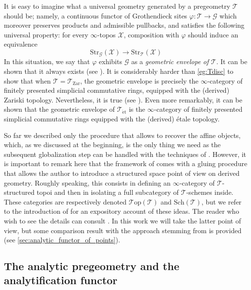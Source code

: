 \documentclass[12pt,a4paper,reqno]{amsart}
\theoremstyle{plain}
\theoremstyle{definition}
\theoremstyle{remark}
\numberwithin{equation}{section}
\begin{document}
It is easy to imagine what a universal geometry generated by a pregeometry ${\mathcal T}$ should be; namely, a continuous functor of Grothendieck sites $\varphi \colon {\mathcal T} \to {\mathcal G}$ which moreover preserves products and admissible pullbacks, and satisfies the following universal property: for every $\infty$-topos ${\mathcal X}$, composition with $\varphi$ should induce an equivalence
\[ {\mathrm{Str}}_{\mathcal G}({\mathcal X}) \to {\mathrm{Str}}_{\mathcal T}({\mathcal X}) \]
In this situation, we say that $\varphi$ exhibits ${\mathcal G}$ as a \emph{geometric envelope of ${\mathcal T}$}. It can be shown that it always exists (see \cite[Lemma 3.4.3]{DAG-V}).
It is considerably harder than \cref{eg:Tdisc} to show that when ${\mathcal T} = {{\mathcal T}_{\mathrm{Zar}}}$, the geometric envelope is precisely the $\infty$-category of finitely presented simplicial commutative rings, equipped with the (derived) Zariski topology. Nevertheless, it is true (see \cite[Proposition 4.2.3]{DAG-V}). Even more remarkably, it can be shown \cite[Proposition 4.3.15]{DAG-V} that the geometric envelope of ${{\mathcal T}_{\mathrm{\acute{e}t}}}$ is the $\infty$-category of finitely presented simplicial commutative rings equipped with the (derived) \'etale topology.

So far we described only the procedure that allows to recover the affine objects, which, as we discussed at the beginning, is the only thing we need as the subsequent globalization step can be handled with the techniques of \cite{HAG-II}. However, it is important to remark here that the framework of \cite{DAG-V} comes with a gluing procedure that allows the author to introduce a structured space point of view on derived geometry.
Roughly speaking, this consists in defining an $\infty$-category of ${\mathcal T}$-structured topoi and then in isolating a full subcategory of ${\mathcal T}$-schemes inside.
These categories are respectively denoted ${\mathcal T\mathrm{op}}({\mathcal T})$ and ${\mathrm{Sch}}({\mathcal T})$, but we refer to the introduction of \cite{Porta_Comparison_2015} for an expository account of these ideas. The reader who wish to see the details can consult \cite[Definitions 1.4.8, 2.3.9]{DAG-V}.
In this work we will take the latter point of view, but some comparison result with the approach stemming from \cite{HAG-II} is provided (see \cref{sec:analytic_functor_of_points}).

\subsection*{The analytic pregeometry and the analytification functor}
\end{document}
